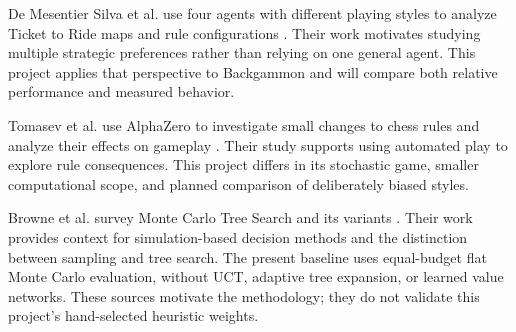 De Mesentier Silva et al. use four agents with different playing styles to analyze Ticket to Ride maps and rule configurations \cite{silva2017}. Their work motivates studying multiple strategic preferences rather than relying on one general agent. This project applies that perspective to Backgammon and will compare both relative performance and measured behavior.

Tomasev et al. use AlphaZero to investigate small changes to chess rules and analyze their effects on gameplay \cite{tomasev2020}. Their study supports using automated play to explore rule consequences. This project differs in its stochastic game, smaller computational scope, and planned comparison of deliberately biased styles.

Browne et al. survey Monte Carlo Tree Search and its variants \cite{browne2012}. Their work provides context for simulation-based decision methods and the distinction between sampling and tree search. The present baseline uses equal-budget flat Monte Carlo evaluation, without UCT, adaptive tree expansion, or learned value networks. These sources motivate the methodology; they do not validate this project's hand-selected heuristic weights.
